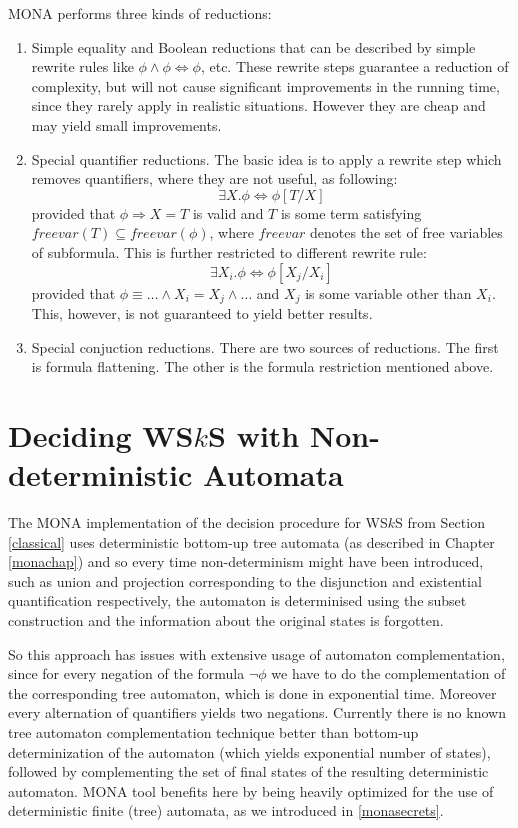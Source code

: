 MONA performs three kinds of reductions:
\begin{enumerate}
 \item Simple equality and Boolean reductions that can be described by simple
 rewrite rules like $\phi \wedge \phi \Leftrightarrow \phi$, etc. These rewrite
 steps guarantee a reduction of complexity, but will not cause significant
 improvements in the running time, since they rarely apply in realistic
 situations. However they are cheap and may yield small improvements.

\item Special quantifier reductions. The basic idea is to apply a rewrite step
which removes quantifiers, where they are not useful, as following: 
\begin{equation}\exists X
. \phi \Leftrightarrow \phi[T/X]\end{equation} provided that $\phi \Rightarrow
X = T$ is valid and $T$ is some term satisfying $freevar(T) \subseteq freevar(\phi)$,
where $freevar$ denotes the set of free variables of subformula. This is further
restricted to different rewrite rule: \begin{equation} \exists X_i . \phi \Leftrightarrow
\phi[X_j/X_i]\end{equation} provided that $\phi \equiv \ldots \wedge X_i = X_j \wedge
\ldots$ and $X_j$ is some variable other than $X_i$. This, however, is not
guaranteed to yield better results.

\item Special conjuction reductions. There are two sources of reductions. The
first is formula flattening. The other is  the formula restriction mentioned
above.
\end{enumerate}

 \chapter{Deciding WS$k$S with Non-deterministic Automata}\label{our}

The \textsc{MONA} implementation of the decision procedure for WS$k$S from
Section \ref{classical} uses deterministic bottom-up tree automata (as described
in Chapter \ref{monachap}) and so every time non-determinism might have been
introduced, such as union and projection corresponding to the disjunction and
existential quantification respectively, the automaton is determinised using the
subset construction and the information about the original states is forgotten.

So this approach has issues with extensive usage of automaton complementation,
since for every negation of the formula $\neg\phi$ we have to do the
complementation of the corresponding tree automaton, which is done in
exponential time. Moreover every alternation of quantifiers yields two
negations. Currently there is no known tree automaton complementation technique
better than bottom-up determinization of the automaton (which yields exponential
number of states), followed by complementing the set of final states of the
resulting deterministic automaton. MONA tool benefits here by being heavily
optimized for the use of deterministic finite (tree) automata, as we introduced
in \ref{monasecrets}.

